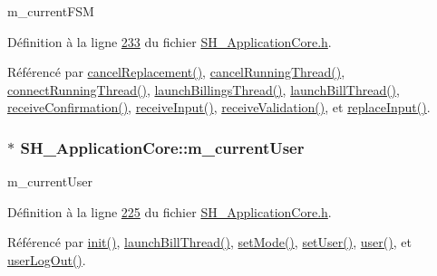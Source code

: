 m\-\_\-current\-F\-S\-M 



Définition à la ligne \hyperlink{SH__ApplicationCore_8h_source_l00233}{233} du fichier \hyperlink{SH__ApplicationCore_8h_source}{S\-H\-\_\-\-Application\-Core.\-h}.



Référencé par \hyperlink{classSH__ApplicationCore_a5b788738972737e1d9b52daeb41e8788}{cancel\-Replacement()}, \hyperlink{classSH__ApplicationCore_af50ebbfed4c12ad7d69cc78f4b0d0d85}{cancel\-Running\-Thread()}, \hyperlink{classSH__ApplicationCore_a3a10c2d662707140340d7a827d119c8d}{connect\-Running\-Thread()}, \hyperlink{classSH__ApplicationCore_a30738281acefd721fe9d06db46dcf123}{launch\-Billings\-Thread()}, \hyperlink{classSH__ApplicationCore_a17a048025bc51a96663029e58c722741}{launch\-Bill\-Thread()}, \hyperlink{classSH__ApplicationCore_a942eacab69b9fe54442591c07773c908}{receive\-Confirmation()}, \hyperlink{classSH__ApplicationCore_ae53ffaee0269f03c3c938595b9b4b39f}{receive\-Input()}, \hyperlink{classSH__ApplicationCore_af450727db378ebec9ec61457b2e13664}{receive\-Validation()}, et \hyperlink{classSH__ApplicationCore_ae8bcd097ea219fc9a54f7d0d9ff9c335}{replace\-Input()}.

\hypertarget{classSH__ApplicationCore_aa61720acee7e06e9828c570e8190304a}{
\subsubsection[{m\-\_\-current\-User}]{$\ast$ S\-H\-\_\-\-Application\-Core\-::m\-\_\-current\-User\hspace{0.3cm}{\ttfamily [private]}}}\label{classSH__ApplicationCore_aa61720acee7e06e9828c570e8190304a}


m\-\_\-current\-User 



Définition à la ligne \hyperlink{SH__ApplicationCore_8h_source_l00225}{225} du fichier \hyperlink{SH__ApplicationCore_8h_source}{S\-H\-\_\-\-Application\-Core.\-h}.



Référencé par \hyperlink{classSH__ApplicationCore_ab50397fef5fa4a514e0a1a0443b886ce}{init()}, \hyperlink{classSH__ApplicationCore_a17a048025bc51a96663029e58c722741}{launch\-Bill\-Thread()}, \hyperlink{classSH__ApplicationCore_aeb87d289ccc9c8209928f23cf8a02ead}{set\-Mode()}, \hyperlink{classSH__ApplicationCore_a83d2df40550a95586e70a08833dc5e5f}{set\-User()}, \hyperlink{classSH__ApplicationCore_aa154f69097fb07514b300f9c8f189da9}{user()}, et \hyperlink{classSH__ApplicationCore_abe6683bdada7ecf979b74656748be106}{user\-Log\-Out()}.

